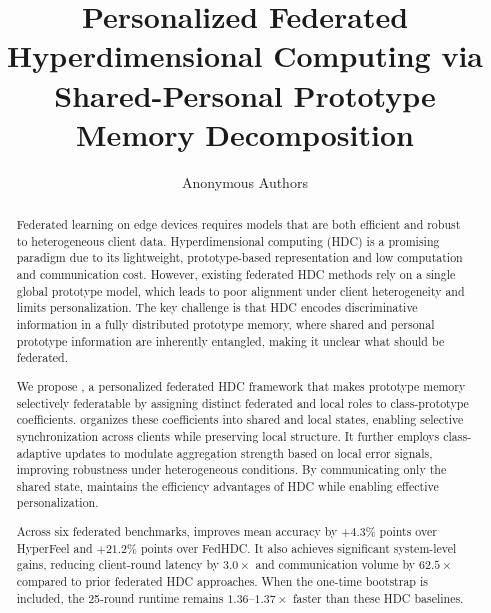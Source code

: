 \documentclass[lettersize,journal]{IEEEtran}
\newcommand{\rev}[1]{#1}
\begin{document}
\title{Personalized Federated Hyperdimensional Computing via Shared-Personal Prototype Memory Decomposition}

\author{Anonymous Authors}


\maketitle

\begin{abstract}
Federated learning on edge devices requires models that are both efficient and robust to heterogeneous client data.
Hyperdimensional computing (HDC) is a promising paradigm due to its lightweight, prototype-based representation and low computation and communication cost.
However, existing federated HDC methods rely on a \rev{single global prototype model}, which leads to poor alignment under client heterogeneity and limits personalization.
The key challenge is that HDC encodes discriminative information in a fully distributed prototype memory, where \rev{shared and personal prototype information} are inherently entangled, making it unclear what should be federated.

We propose \Design, a personalized federated HDC framework that \rev{makes prototype memory selectively federatable by assigning distinct federated and local roles to class-prototype coefficients}.
\Design \rev{organizes these coefficients into shared and local states}, enabling selective synchronization across clients while preserving local structure.
It further employs class-adaptive updates to modulate aggregation strength based on local error signals, improving robustness under heterogeneous conditions.
By communicating only the \rev{shared state}, \Design maintains the efficiency advantages of HDC while enabling effective personalization.

Across \rev{six} federated benchmarks, \Design improves mean accuracy by $+4.3$\% points over HyperFeel and $+21.2$\% points over FedHDC.
It also achieves significant system-level gains, reducing client-round latency by $3.0\times$ and communication volume by $62.5\times$ compared to prior federated HDC approaches.
\rev{When the one-time bootstrap is included, the 25-round runtime remains \(1.36\)--\(1.37\times\) faster than these HDC baselines.}
\end{abstract}
\end{document}
